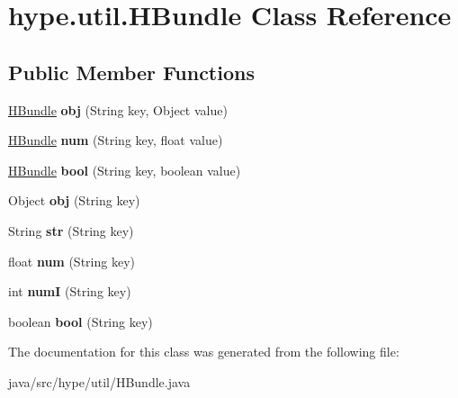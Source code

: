\hypertarget{classhype_1_1util_1_1_h_bundle}{\section{hype.\-util.\-H\-Bundle Class Reference}
\label{classhype_1_1util_1_1_h_bundle}
}
\subsection*{Public Member Functions}
\begin{DoxyCompactItemize}
\item 
\hypertarget{classhype_1_1util_1_1_h_bundle_a98c6756d068540847ecbd27cd516fed7}{\hyperlink{classhype_1_1util_1_1_h_bundle}{H\-Bundle} {\bfseries obj} (String key, Object value)}\label{classhype_1_1util_1_1_h_bundle_a98c6756d068540847ecbd27cd516fed7}

\item 
\hypertarget{classhype_1_1util_1_1_h_bundle_a0dfbb17eba2677cae1caaed013b36ea6}{\hyperlink{classhype_1_1util_1_1_h_bundle}{H\-Bundle} {\bfseries num} (String key, float value)}\label{classhype_1_1util_1_1_h_bundle_a0dfbb17eba2677cae1caaed013b36ea6}

\item 
\hypertarget{classhype_1_1util_1_1_h_bundle_a38b92d226128547719c0adceebdb8ef8}{\hyperlink{classhype_1_1util_1_1_h_bundle}{H\-Bundle} {\bfseries bool} (String key, boolean value)}\label{classhype_1_1util_1_1_h_bundle_a38b92d226128547719c0adceebdb8ef8}

\item 
\hypertarget{classhype_1_1util_1_1_h_bundle_a188e58353d1b8804dffb24d9d9d1c13c}{Object {\bfseries obj} (String key)}\label{classhype_1_1util_1_1_h_bundle_a188e58353d1b8804dffb24d9d9d1c13c}

\item 
\hypertarget{classhype_1_1util_1_1_h_bundle_a80634b97b3eb742e8df4da4e8ef0ebfc}{String {\bfseries str} (String key)}\label{classhype_1_1util_1_1_h_bundle_a80634b97b3eb742e8df4da4e8ef0ebfc}

\item 
\hypertarget{classhype_1_1util_1_1_h_bundle_abc6fde0b241eb0bf81a19b1706c40d89}{float {\bfseries num} (String key)}\label{classhype_1_1util_1_1_h_bundle_abc6fde0b241eb0bf81a19b1706c40d89}

\item 
\hypertarget{classhype_1_1util_1_1_h_bundle_a0a9d3c38b42599b343222eff9d567388}{int {\bfseries num\-I} (String key)}\label{classhype_1_1util_1_1_h_bundle_a0a9d3c38b42599b343222eff9d567388}

\item 
\hypertarget{classhype_1_1util_1_1_h_bundle_aec9b498495c782a30c937e8cf0307cf7}{boolean {\bfseries bool} (String key)}\label{classhype_1_1util_1_1_h_bundle_aec9b498495c782a30c937e8cf0307cf7}

\end{DoxyCompactItemize}


The documentation for this class was generated from the following file\-:\begin{DoxyCompactItemize}
\item 
java/src/hype/util/H\-Bundle.\-java\end{DoxyCompactItemize}
